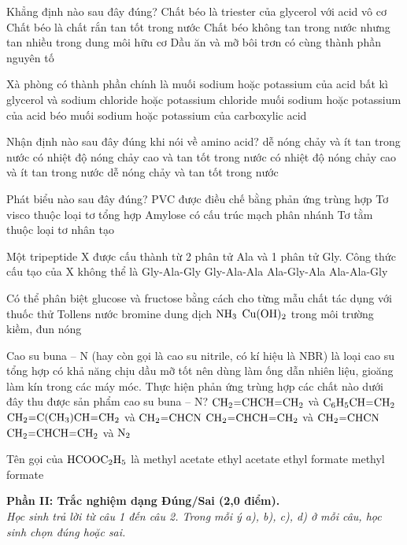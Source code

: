 \documentclass[11pt,a4paper]{article}
\begin{document}
\begin{ex}
Khẳng định nào sau đây đúng?
\choice
{Chất béo là triester của glycerol với acid vô cơ}
{Chất béo là chất rắn tan tốt trong nước}
{\True Chất béo không tan trong nước nhưng tan nhiều trong dung môi hữu cơ}
{Dầu ăn và mỡ bôi trơn có cùng thành phần nguyên tố}
\end{ex}
\begin{ex}
Xà phòng có thành phần chính là
\choice
{muối sodium hoặc potassium của acid bất kì}
{glycerol và sodium chloride hoặc potassium chloride}
{\True muối sodium hoặc potassium của acid béo}
{muối sodium hoặc potassium của carboxylic acid}
\end{ex}
\begin{ex}
Nhận định nào sau đây đúng khi nói về amino acid?
\choice
{dễ nóng chảy và ít tan trong nước}
{\True có nhiệt độ nóng chảy cao và tan tốt trong nước}
{có nhiệt độ nóng chảy cao và ít tan trong nước}
{dễ nóng chảy và tan tốt trong nước}
\end{ex}
\begin{ex}
Phát biểu nào sau đây đúng?
\choice
{\True PVC được điều chế bằng phản ứng trùng hợp}
{Tơ visco thuộc loại tơ tổng hợp}
{Amylose có cấu trúc mạch phân nhánh}
{Tơ tằm thuộc loại tơ nhân tạo}
\end{ex}
\begin{ex}
Một tripeptide X được cấu thành từ 2 phân tử Ala và 1 phân tử Gly. Công thức cấu tạo của X không thể là
\choice
{\True Gly-Ala-Gly}
{Gly-Ala-Ala}
{Ala-Gly-Ala}
{Ala-Ala-Gly}
\end{ex}
\begin{ex}
Có thể phân biệt glucose và fructose bằng cách cho từng mẫu chất tác dụng với
\choice
{thuốc thử Tollens}
{\True nước bromine}
{dung dịch $\ce{NH3}$}
{$\ce{Cu(OH)2}$ trong môi trường kiềm, đun nóng}
\end{ex}
\begin{ex}
Cao su buna -- N (hay còn gọi là cao su nitrile, có kí hiệu là NBR) là loại cao su tổng hợp có khả năng chịu dầu mỡ tốt nên dùng làm ống dẫn nhiên liệu, gioăng làm kín trong các máy móc. Thực hiện phản ứng trùng hợp các chất nào dưới đây thu được sản phẩm cao su buna -- N?
\choice
{$\ce{CH2=CHCH=CH2}$ và $\ce{C6H5CH=CH2}$}
{$\ce{CH2=C(CH3)CH=CH2}$ và $\ce{CH2=CHCN}$}
{\True $\ce{CH2=CHCH=CH2}$ và $\ce{CH2=CHCN}$}
{$\ce{CH2=CHCH=CH2}$ và $\ce{N2}$}
\end{ex}
\begin{ex}
Tên gọi của $\ce{HCOOC2H5}$ là
\choice
{methyl acetate}
{ethyl acetate}
{\True ethyl formate}
{methyl formate}
\end{ex}
\vspace{4pt}
\noindent
{\color{mainGreen}\textbf{\large Phần II: Trắc nghiệm dạng Đúng/Sai (2,0 điểm).}}\\
\textit{\small Học sinh trả lời từ câu 1 đến câu 2. Trong mỗi ý a), b), c), d) ở mỗi câu, học sinh chọn đúng hoặc sai.}
\vspace{2pt}
\end{document}
